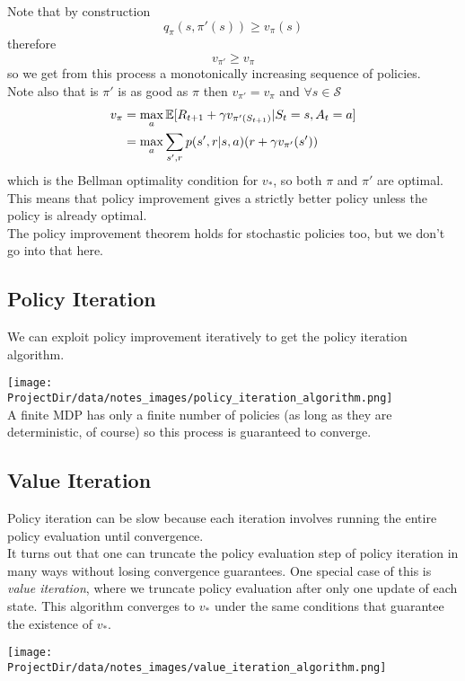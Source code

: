 Note that by construction
\[
    q_\pi(s, \pi'(s)) \geq v_\pi(s)
\]
therefore
\[
    v_{\pi'} \geq v_\pi
\]
so we get from this process a monotonically increasing sequence of policies.\\

Note also that is $\pi'$ is as good as $\pi$ then $v_{\pi'} = v_\pi$ and $\forall s \in \mathcal{S}$
\begin{align*}
    v_\pi &= \max_a \mathbb{E}{}[R_{t+1} + \gamma v_{\pi'(S_{t+1})}| S_t=s, A_t=a]\\
          &= \max_a \sum_{s', r} p(s', r|s, a)(r + \gamma v_{\pi'}(s'))
\end{align*}
which is the Bellman optimality condition for $v_*$, so both $\pi$ and $\pi'$ are optimal. This means that policy improvement gives a strictly better policy unless the policy is already optimal. \\

The policy improvement theorem holds for stochastic policies too, but we don't go into that here.
          

\subsection{Policy Iteration}
We can exploit policy improvement iteratively to get the policy iteration algorithm.

\texttt{[image: \\ProjectDir/data/notes\_images/policy\_iteration\_algorithm.png]}
\mbox{}\\
A finite MDP has only a finite number of policies (as long as they are deterministic, of course) so this process is guaranteed to converge.

\subsection{Value Iteration}
Policy iteration can be slow because each iteration involves running the entire policy evaluation until convergence. \\

It turns out that one can truncate the policy evaluation step of policy iteration in many ways without losing convergence guarantees. One special case of this is \emph{value iteration}, where we truncate policy evaluation after only one update of each state. This algorithm converges to $v_*$ under the same conditions that guarantee the existence of $v_*$. 

\texttt{[image: \\ProjectDir/data/notes\_images/value\_iteration\_algorithm.png]}
\mbox{}\\

